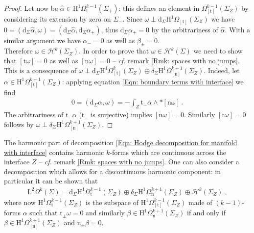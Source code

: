 \begin{proof}
	Let now be $\hat{\alpha}\in\mathrm{H}^1\Omega^{k-1}_{\mathrm{t}}(\Sigma_+)$: this defines an element in $\Omega^{k-1}_{[\mathrm{t}]}(\Sigma_Z)$ by considering its extension by zero on $\Sigma_-$.
	Since $\omega\perp\mathrm{d}_\Sigma\mathrm{H}^1\Omega_{[\mathrm{t}]}(\Sigma_Z)$ we have $0=(\mathrm{d}_\Sigma\hat{\alpha},\omega)=(\mathrm{d}_\Sigma\hat{\alpha},\mathrm{d}_\Sigma\alpha_+)$, thus $\mathrm{d}_\Sigma\alpha_+=0$ by the arbitrariness of $\hat{\alpha}$.
	With a similar argument we have $\alpha_-=0$ as well as $\beta_\pm=0$.
	\\
	Therefore $\omega\in\mathcal{H}^k(\Sigma_Z)$.
	In order to prove that $\omega\in\mathcal{H}^k(\Sigma)$ we need to show that $[\mathrm{t}\omega]=0$ as well as $[\mathrm{n}\omega]=0$ -- \textit{cf.} remark \ref{Rmk: spaces with no jumps}.
	This is a consequence of $\omega\perp\mathrm{d}_\Sigma \mathrm{H}^1\Omega^k_{[\mathrm{t}]}(\Sigma_Z)\oplus\delta_\Sigma \mathrm{H}^1\Omega^{k+1}_{[\mathrm{n}]}(\Sigma_Z)$.
	Indeed, let $\alpha\in\mathrm{H}^1\Omega^{k-1}_{[\mathrm{t}]}(\Sigma_Z)$: applying equation \eqref{Eqn: boundary terms with interface} we find
	\begin{align}
		0=(\mathrm{d}_\Sigma\alpha,\omega)=-\int_Z\mathrm{t}_-\overline{\alpha}\wedge\ast[\mathrm{n}\omega]\,.
	\end{align}
	The arbitrariness of $\mathrm{t}_-\alpha$ ($\mathrm{t}_-$ is surjective) implies $[\mathrm{n}\omega]=0$.
	Similarly $[\mathrm{t}\omega]=0$ follows by $\omega\perp\delta_\Sigma\mathrm{H}^1\Omega^{k+1}_{[\mathrm{n}]}(\Sigma_Z)$.
\end{proof}
\begin{remark}
	The harmonic part of decomposition \eqref{Eqn: Hodge decomposition for manifold with interface} contains harmonic $k$-forms which are continuous across the interface $Z$ -- \textit{cf.} remark \ref{Rmk: spaces with no jumps}.
	One can also consider a decomposition which allows for a discontinuous harmonic component: in particular it can be shown that
	\begin{align*}
		\mathrm{L}^2\Omega^k(\Sigma)=
		\mathrm{d}_\Sigma\mathrm{H}^1\Omega^{k-1}_{\mathrm{t}}(\Sigma_Z)\oplus
		\delta_\Sigma\mathrm{H}^1\Omega^{k+1}_{\mathrm{n}}(\Sigma_Z)\oplus
		\mathcal{H}^k(\Sigma_Z)\,,
	\end{align*}
	where now $\mathrm{H}^1\Omega^{k-1}_{\mathrm{t}}(\Sigma_Z)$ is the subspace of $\mathrm{H}^1\Omega^{k-1}_{[\mathrm{t}]}(\Sigma_Z)$ made of $(k-1)$-forms $\alpha$ such that $\mathrm{t}_\pm\omega=0$ and similarly $\beta\in\mathrm{H}^1\Omega^{k+1}_{\mathrm{n}}(\Sigma_Z)$ if and only if $\beta\in\mathrm{H}^1\Omega^{k+1}_{[\mathrm{n}]}(\Sigma_Z)$ and $\mathrm{n}_\pm\beta=0$.
\end{remark}
